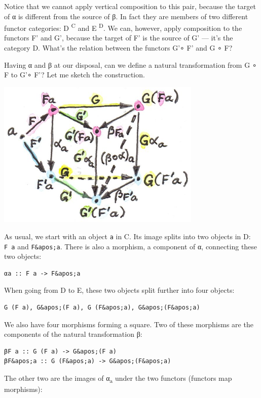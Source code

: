 Notice that we cannot apply vertical composition to this pair, because
the target of α is different from the source of β. In fact they are
members of two different functor categories: D \textsuperscript{C} and E
\textsuperscript{D}. We can, however, apply composition to the functors
F' and G', because the target of F' is the source of G' --- it's the
category D. What's the relation between the functors G'∘ F' and G ∘ F?

Having α and β at our disposal, can we define a natural transformation
from G ∘ F to G'∘ F'? Let me sketch the construction.

\includegraphics[width=3.84375in]{images/9_horizontal.jpg}

As usual, we start with an object \texttt{a} in C. Its image splits into
two objects in D: \texttt{F\ a} and \texttt{F\&apos;a}. There is also a
morphism, a component of α, connecting these two objects:

\begin{verbatim}
αa :: F a -> F&apos;a
\end{verbatim}

When going from D to E, these two objects split further into four
objects:

\begin{verbatim}
G (F a), G&apos;(F a), G (F&apos;a), G&apos;(F&apos;a)
\end{verbatim}

We also have four morphisms forming a square. Two of these morphisms are
the components of the natural transformation β:

\begin{verbatim}
βF a :: G (F a) -> G&apos;(F a)
βF&apos;a :: G (F&apos;a) -> G&apos;(F&apos;a)
\end{verbatim}

The other two are the images of α\textsubscript{a} under the two
functors (functors map morphisms):

